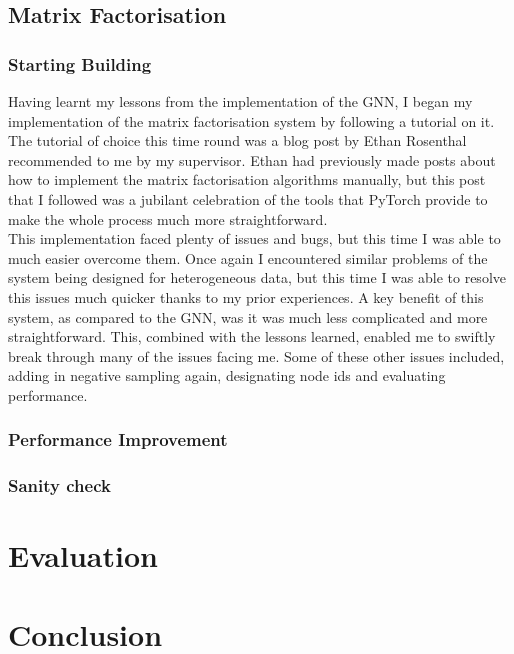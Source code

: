 \documentclass{l4proj}
\begin{document}
\section{Matrix Factorisation}

\subsection{Starting Building}

Having learnt my lessons from the implementation of the GNN, I began my implementation of the matrix factorisation system by following a tutorial on it. The tutorial of choice this time round was a blog post by Ethan Rosenthal recommended to me by my supervisor. Ethan had previously made posts about how to implement the matrix factorisation algorithms manually, but this post that I followed was a jubilant celebration of the tools that PyTorch provide to make the whole process much more straightforward. \\

This implementation faced plenty of issues and bugs, but this time I was able to much easier overcome them. Once again I encountered similar problems of the system being designed for heterogeneous data, but this time I was able to resolve this issues much quicker thanks to my prior experiences. A key benefit of this system, as compared to the GNN, was it was much less complicated and more straightforward. This, combined with the lessons learned, enabled me to swiftly break through many of the issues facing me. Some of these other issues included, adding in negative sampling again, designating node ids and evaluating performance. \\

\subsection{Performance Improvement}



\subsection{Sanity check}



\chapter{Evaluation} 

\chapter{Conclusion}    
\end{document}
